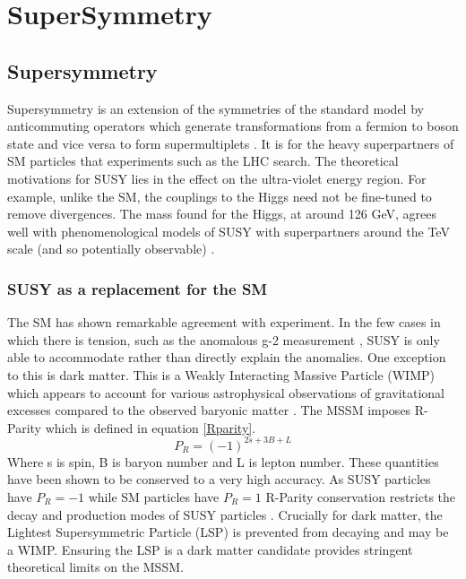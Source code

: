 
\chapter{SuperSymmetry} %

\label{Chapter3} %



\section{Supersymmetry}

Supersymmetry is an extension of the symmetries of the standard model by anticommuting operators which generate transformations from a fermion to boson state and vice versa to form supermultiplets \cite{susyintro}. It is for the heavy superpartners of SM particles that experiments such as the LHC search. The theoretical motivations for SUSY lies in the effect on the ultra-violet energy region. For example, unlike the SM, the couplings to the Higgs need not be fine-tuned to remove divergences. The mass found for the Higgs, at around 126 GeV, agrees well with phenomenological models of SUSY with superpartners around the TeV scale (and so potentially observable) \cite{susyhiggs}. 
\subsection{SUSY as a replacement for the SM}
The SM has shown remarkable agreement with experiment. In the few cases in which there is tension, such as the anomalous g-2 measurement \cite{gm2}, SUSY is only able to accommodate rather than directly explain the anomalies. One exception to this is dark matter. This is a Weakly Interacting Massive Particle (WIMP) which appears to account for various astrophysical observations of gravitational excesses compared to the observed baryonic matter \cite{dm}. The MSSM imposes R-Parity which is defined in equation \ref{Rparity}. 
\begin{equation}
\label{Rparity}
P_R=(-1)^{2s+3B+L}
\end{equation}
Where s is spin, B is baryon number and L is lepton number. These quantities have been shown to be conserved to a very high accuracy. As SUSY particles have $P_R=-1$ while SM particles have $P_R=1$ R-Parity conservation restricts the decay and production modes of SUSY particles \cite{susywimp}. Crucially for dark matter, the Lightest Supersymmetric Particle (LSP) is prevented from decaying and may be a WIMP. Ensuring the LSP is a dark matter candidate provides stringent theoretical limits on the MSSM.

